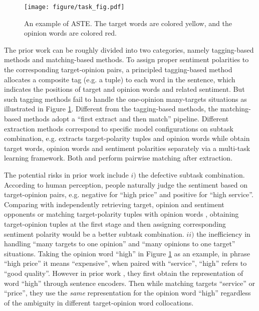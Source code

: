 \documentclass[11pt]{article}
\begin{document}
\begin{figure}[t]
    \centering
    \texttt{[image: figure/task\_fig.pdf]}
    \caption{An example of ASTE. The target words are colored yellow, and the opinion words are colored red.}
    \label{fig:data_fig}
\end{figure}

The prior work can be roughly divided into two categories, namely tagging-based methods and matching-based methods.
To assign proper sentiment polarities to the corresponding target-opinion pairs, a principled tagging-based method \cite{xu2020position} allocates a composite tag (e.g. a tuple) to each word in the sentence, which indicates the positions of target and opinion words and related sentiment. 
But such tagging methods fail to handle the one-opinion many-targets situations as illustrated in Figure \ref{fig:data_fig}. 
Different from the tagging-based methods, 
the matching-based methods adopt a ``first extract and then match'' pipeline.
Different extraction methods correspond to specific model configurations on subtask combination, e.g.
\citet{peng2020knowing} extracts target-polarity tuples and opinion words while \citet{zhang2020multi} obtain target words, opinion words and sentiment polarities separately via a multi-task learning framework.
Both \citet{peng2020knowing} and \citet{zhang2020multi} perform pairwise matching after extraction.

The potential risks in prior work include $i)$ the defective subtask combination. According to human perception, people naturally judge the sentiment based on target-opinion pairs, e.g. negative for ``high price'' and positive for ``high service''. Comparing with independently retrieving target, opinion and sentiment opponents \cite{zhang2020multi} or matching target-polarity tuples with opinion words \cite{peng2020knowing}, obtaining target-opinion tuples at the first stage and then assigning corresponding sentiment polarity would be a better subtask combination.
$ii)$ the inefficiency in handling ``many targets to one opinion'' and ``many opinions to one target'' situations. 
Taking the opinion word ``high'' in Figure \ref{fig:data_fig} as an example, in phrase ``high price'' it means ``expensive'', when paired with ``service'', ``high'' refers to ``good quality''.
However in prior work \cite{peng2020knowing,zhang2020multi}, they first obtain the representation of word ``high'' through 
sentence encoders. 
Then while matching targets ``service'' or ``price'', they use the \textit{same} representation for the opinion word ``high'' regardless of the ambiguity in different target-opinion word collocations.
\end{document}
